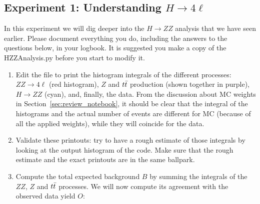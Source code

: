 


\subsection{Experiment 1: Understanding $H\rightarrow 4\ell$}

In this experiment we will dig deeper into the $H\rightarrow ZZ$ analysis that we have seen earlier. Please document everything you do, including the answers to the questions below, in your logbook. It is suggested you make a copy of the HZZAnalysis.py before you start to modify it.

\begin{enumerate} 
\item Edit the file to print the histogram integrals of the different processes: $ZZ\rightarrow 4\ell$ (red histogram), $Z$ and $t\bar{t}$ production (shown together in purple), $H\rightarrow ZZ$ (cyan), and, finally, the data. From the discussion about MC weights in Section~\ref{sec:review_notebook}, it should be clear that the integral of the histograms and the actual number of events are different for MC (because of all the applied weights), while they will coincide for the data. 
\item Validate these printouts: try to have a rough estimate of those integrals by looking at the output histogram of the code. Make sure that the rough estimate and the exact printouts are in the same ballpark.
\item Compute the total expected background $B$ by summing the integrals of the $ZZ$, $Z$ and $t\bar{t}$ processes. We will now compute its agreement with the observed data yield $O$: 
\end{enumerate}

